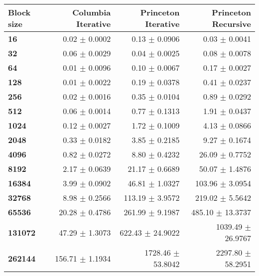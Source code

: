 \begin{tabular}{lrrr}\toprule
\textbf{Block size}  & \textbf{Columbia Iterative} & \textbf{Princeton Iterative} & \textbf{Princeton Recursive}\\\midrule
\textbf{16}  & 0.02 $\pm$ 0.0002 & 0.13 $\pm$ 0.0906 & 0.03 $\pm$ 0.0041\\
\textbf{32}  & 0.06 $\pm$ 0.0029 & 0.04 $\pm$ 0.0025 & 0.08 $\pm$ 0.0078\\
\textbf{64}  & 0.01 $\pm$ 0.0096 & 0.10 $\pm$ 0.0067 & 0.17 $\pm$ 0.0027\\
\textbf{128}  & 0.01 $\pm$ 0.0022 & 0.19 $\pm$ 0.0378 & 0.41 $\pm$ 0.0237\\
\textbf{256}  & 0.02 $\pm$ 0.0016 & 0.35 $\pm$ 0.0104 & 0.89 $\pm$ 0.0292\\
\textbf{512}  & 0.06 $\pm$ 0.0014 & 0.77 $\pm$ 0.1313 & 1.91 $\pm$ 0.0437\\
\textbf{1024}  & 0.12 $\pm$ 0.0027 & 1.72 $\pm$ 0.1009 & 4.13 $\pm$ 0.0866\\
\textbf{2048}  & 0.33 $\pm$ 0.0182 & 3.85 $\pm$ 0.2185 & 9.27 $\pm$ 0.1674\\
\textbf{4096}  & 0.82 $\pm$ 0.0272 & 8.80 $\pm$ 0.4232 & 26.09 $\pm$ 0.7752\\
\textbf{8192}  & 2.17 $\pm$ 0.0639 & 21.17 $\pm$ 0.6689 & 50.07 $\pm$ 1.4876\\
\textbf{16384}  & 3.99 $\pm$ 0.0902 & 46.81 $\pm$ 1.0327 & 103.96 $\pm$ 3.0954\\
\textbf{32768}  & 8.98 $\pm$ 0.2566 & 113.19 $\pm$ 3.9572 & 219.02 $\pm$ 5.5642\\
\textbf{65536}  & 20.28 $\pm$ 0.4786 & 261.99 $\pm$ 9.1987 & 485.10 $\pm$ 13.3737\\
\textbf{131072}  & 47.29 $\pm$ 1.3073 & 622.43 $\pm$ 24.9022 & 1039.49 $\pm$ 26.9767\\
\textbf{262144} & 156.71 $\pm$ 1.1934 & 1728.46 $\pm$ 53.8042 & 2297.80 $\pm$ 58.2951\\
\bottomrule
\end{tabular}
